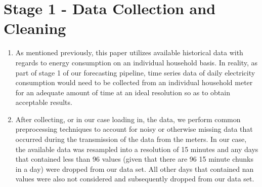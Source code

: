 \section{Stage 1 - Data Collection and Cleaning}
\label{sec:Methodology:Stage-1}
\begin{adjustwidth}{-1.65cm}{0.0cm}%
    \begin{enumerate}[label=Step 1.\arabic*:, leftmargin=*]
    \setlength\itemsep{1em}
        \item As mentioned previously, this paper utilizes available historical data with regards to energy consumption on an individual household basis. In reality, as part of stage 1 of our forecasting pipeline, time series data of daily electricity consumption would need to be collected from an individual household meter for an adequate amount of time at an ideal resolution so as to obtain acceptable results.
        \item After collecting, or in our case loading in, the data, we perform common preprocessing techniques to account for noisy or otherwise missing data that occurred during the transmission of the data from the meters. In our case, the available data was resampled into a resolution of 15 minutes and any days that contained less than 96 values (given that there are 96 15 minute chunks in a day) were dropped from our data set. All other days that contained \gls{nan} values were also not considered and subsequently dropped from our data set.
    \end{enumerate}
\end{adjustwidth}

